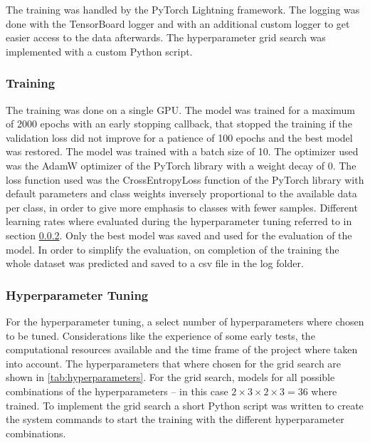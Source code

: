 The training was handled by the PyTorch Lightning framework. The logging was done
with the TensorBoard logger and with an additional custom logger to get easier access to the
data afterwards. The hyperparameter grid search was implemented with a custom Python script.

\subsubsection{Training}%

The training was done on a single GPU. The model was trained for a maximum of 2000 epochs
with an early stopping callback, that stopped the training if the validation loss did not improve
for a patience of 100 epochs and the best model was restored. The model was trained with a batch size of 10. The optimizer used was the AdamW
optimizer of the PyTorch library with a weight decay of 0. The loss function used was the
CrossEntropyLoss function of the PyTorch library with default parameters and class weights
inversely proportional to the available data per class, in order to give more emphasis to classes with fewer samples. 
Different learning rates where evaluated during the hyperparameter
tuning referred to in section \ref{hyperparameter_tuning}. Only the best model was saved and used for
the evaluation of the model. In order to simplify the evaluation, on completion of the training
the whole dataset was predicted and saved to a csv file in the log folder.

\subsubsection{Hyperparameter Tuning}%
\label{hyperparameter_tuning}

For the hyperparameter tuning, a select number of hyperparameters where chosen to be tuned.
Considerations like the experience of some early tests, the computational resources available
and the time frame of the project where taken into account. The hyperparameters that where
chosen for the grid search are shown in \autoref{tab:hyperparameters}. For the grid search,
models for all possible combinations of the hyperparameters -- in this case \( 2 \times 3 \times 2 \times 3 = 36 \) 
where trained. To implement the grid search a short Python
script was written to create the system commands to start the training with the different
hyperparameter combinations.

